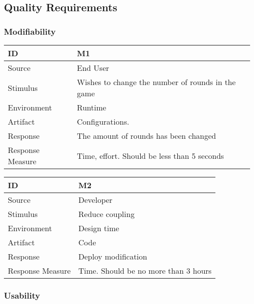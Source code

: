\subsection{Quality Requirements}

\subsubsection{Modifiability}

\begin{center}
    \begin{tabular}{ | l | p{12cm} |}
    \hline
	\textbf{ID} & \textbf{M1} \\ \hline
	Source & End User\\ \hline 
	Stimulus & Wishes to change the number of rounds in the game \\ \hline 
	Environment & Runtime\\ \hline 
	Artifact & Configurations. \\ \hline 
	Response & The amount of rounds has been changed\\ \hline 
	Response Measure & Time, effort. Should be less than 5 seconds\\ \hline 

    \hline
    \end{tabular}
\end{center}

\begin{center}
    \begin{tabular}{ | l | p{12cm} |}
    \hline
	\textbf{ID} & \textbf{M2} \\ \hline
	Source & Developer\\ \hline 
	Stimulus & Reduce coupling  \\ \hline 
	Environment & Design time\\ \hline 
	Artifact & Code \\ \hline 
	Response & Deploy modification\\ \hline 
	Response Measure & Time. Should be no more than 3 hours\\ \hline 

    \hline
    \end{tabular}
\end{center}

\subsubsection{Usability}


